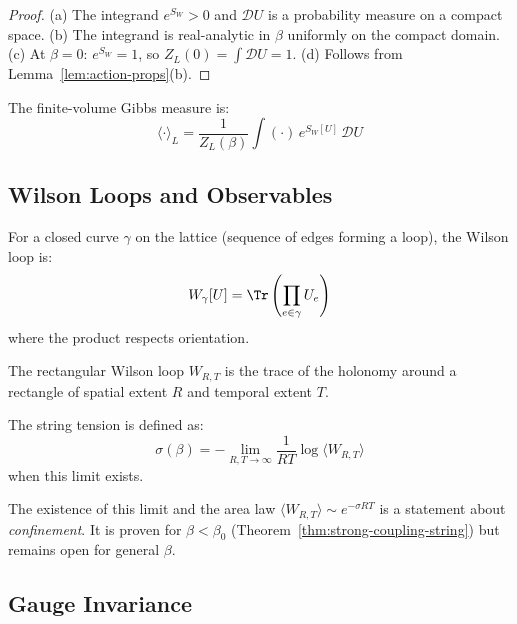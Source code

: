 \begin{proof}
(a) The integrand $e^{S_W} > 0$ and $\mathcal{D}U$ is a probability measure on a compact space.
(b) The integrand is real-analytic in $\beta$ uniformly on the compact domain.
(c) At $\beta = 0$: $e^{S_W} = 1$, so $Z_L(0) = \int \mathcal{D}U = 1$.
(d) Follows from Lemma~\ref{lem:action-props}(b).
\end{proof}

\begin{definition}
\label{def:gibbs}
The finite-volume Gibbs measure is:
\[
\langle \cdot \rangle_L = \frac{1}{Z_L(\beta)} \int (\cdot) \, e^{S_W[U]} \, \mathcal{D}U
\]
\end{definition}

\subsection{Wilson Loops and Observables}

\begin{definition}
\label{def:wilson-loop}
For a closed curve $\gamma$ on the lattice (sequence of edges forming a loop), 
the Wilson loop is:
\[
W_\gamma[U] = \Tr\left( \prod_{e \in \gamma} U_e \right)
\]
where the product respects orientation.
\end{definition}

\begin{definition}
\label{def:rectangular-loop}
The rectangular Wilson loop $W_{R,T}$ is the trace of the holonomy around a 
rectangle of spatial extent $R$ and temporal extent $T$.
\end{definition}

\begin{definition}
\label{def:string-tension-sec02}
The string tension is defined as:
\[
\sigma(\beta) = -\lim_{R,T \to \infty} \frac{1}{RT} \log \langle W_{R,T} \rangle
\]
when this limit exists.
\end{definition}

\begin{remark}
The existence of this limit and the area law $\langle W_{R,T} \rangle \sim e^{-\sigma RT}$ 
is a statement about \emph{confinement}. It is proven for $\beta < \beta_0$ 
(Theorem~\ref{thm:strong-coupling-string}) but remains open for general $\beta$.
\end{remark}

\subsection{Gauge Invariance}
\label{sec:gauge-invariance}

